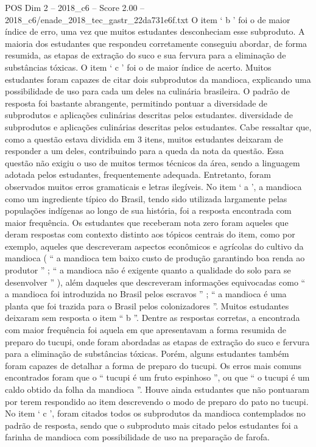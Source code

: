 \begin{textsample}{POS Dim 2 – 2018\_c6 – Score 2.00 – 2018\_c6/enade\_2018\_tec\_gastr\_22da731e6f.txt}
O item ‘ b ’ foi o de maior índice de erro, uma vez que muitos estudantes desconheciam esse subproduto.
A maioria dos estudantes que respondeu corretamente conseguiu abordar, de forma resumida, as etapas de extração do suco e sua fervura para a eliminação de substâncias tóxicas.
O item ‘ c ’ foi o de maior índice de acerto.
Muitos estudantes foram capazes de citar dois subprodutos da mandioca, explicando uma possibilidade de uso para cada um deles na culinária brasileira.
O padrão de resposta foi bastante abrangente, permitindo pontuar a diversidade de subprodutos e aplicações culinárias descritas pelos estudantes. diversidade de subprodutos e aplicações culinárias descritas pelos estudantes.
Cabe ressaltar que, como a questão estava dividida em 3 itens, muitos estudantes deixaram de responder a um deles, contribuindo para a queda da nota da questão.
Essa questão não exigiu o uso de muitos termos técnicos da área, sendo a linguagem adotada pelos estudantes, frequentemente adequada.
Entretanto, foram observados muitos erros gramaticais e letras ilegíveis.
No item ‘ a ’, a mandioca como um ingrediente típico do Brasil, tendo sido utilizada largamente pelas populações indígenas ao longo de sua história, foi a resposta encontrada com maior frequência.
Os estudantes que receberam nota zero foram aqueles que deram respostas com contexto distinto aos tópicos centrais do item, como por exemplo, aqueles que descreveram aspectos econômicos e agrícolas do cultivo da mandioca ( “ a mandioca tem baixo custo de produção garantindo boa renda ao produtor ” ; “ a mandioca não é exigente quanto a qualidade do solo para se desenvolver ” ), além daqueles que descreveram informações equivocadas como “ a mandioca foi introduzida no Brasil pelos escravos ” ; “ a mandioca é uma planta que foi trazida para o Brasil pelos colonizadores ”.
Muitos estudantes deixaram sem resposta o item “ b ”.
Dentre as respostas corretas, a encontrada com maior frequência foi aquela em que apresentavam a forma resumida de preparo do tucupi, onde foram abordadas as etapas de extração do suco e fervura para a eliminação de substâncias tóxicas.
Porém, alguns estudantes também foram capazes de detalhar a forma de preparo do tucupi.
Os erros mais comuns encontrados foram que o “ tucupi é um fruto espinhoso ”, ou que “ o tucupi é um caldo obtido da folha da mandioca ”.
Houve ainda estudantes que não pontuaram por terem respondido ao item descrevendo o modo de preparo do pato no tucupi.
No item ‘ c ’, foram citados todos os subprodutos da mandioca contemplados no padrão de resposta, sendo que o subproduto mais citado pelos estudantes foi a farinha de mandioca com possibilidade de uso na preparação de farofa.

\end{textsample}
